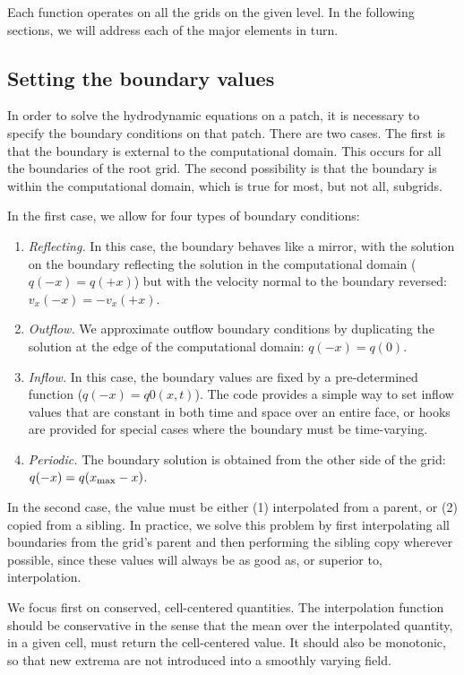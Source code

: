 Each function operates on all the grids on the given level.  In the following sections, we will address each of the major elements in turn.

\subsection{Setting the boundary values}
\label{sec:interpolation}

In order to solve the hydrodynamic equations on a patch, it is necessary to specify the boundary conditions on that patch.  There are two cases.  The first is that the boundary is external to the computational domain.  This occurs for all the boundaries of the root grid.  The second possibility is that the boundary is within the computational domain, which is true for most, but not all, subgrids.

In the first case, we allow for four types of boundary conditions:
\begin{enumerate}
  \item{\em Reflecting.} In this case, the boundary behaves like a mirror, with the solution on the boundary reflecting the solution in the computational domain ($q(-x) = q(+x)$) but with the velocity normal to the boundary reversed: $v_x(-x) = -v_x(+x)$.
  \item{\em Outflow.}  We approximate outflow boundary conditions by duplicating the solution at the edge of the computational domain: $q(-x) = q(0)$.
  \item{\em Inflow.} In this case, the boundary values are fixed by a pre-determined function ($q(-x) = q0(x,t)$).  The code provides a simple way to set inflow values that are constant in both time and space over an entire face, or hooks are provided for special cases where the boundary must be time-varying.
  \item{\em Periodic.} The boundary solution is obtained from the other side of the grid: $q(-x) = q(x_{\rm{max}}-x)$.
\end{enumerate}

In the second case, the value must be either (1) interpolated from a parent, or (2) copied from a sibling.  In practice, we solve this problem by first interpolating all boundaries from the grid's parent and then performing the sibling copy wherever possible, since these values will always be as good as, or superior to, interpolation.

We focus first on conserved, cell-centered quantities.  The interpolation function should be conservative in the sense that the mean over the interpolated quantity, in a given cell, must return the cell-centered value.  It should also be monotonic, so that new extrema are not introduced into a smoothly varying field.

